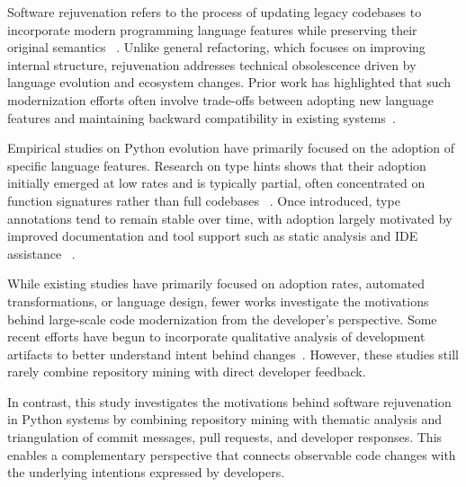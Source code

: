Software rejuvenation refers to the process of updating legacy codebases to incorporate modern programming language features while preserving their original semantics ~\cite{DBLP:conf/sofsem/PirkelbauerDS10}. Unlike general refactoring, which focuses on improving internal structure, rejuvenation addresses technical obsolescence driven by language evolution and ecosystem changes. Prior work has highlighted that such modernization efforts often involve trade-offs between adopting new language features and maintaining backward compatibility in existing systems~\cite{mendonca2026}.

Empirical studies on Python evolution have primarily focused on the adoption of specific language features. Research on type hints shows that their adoption initially emerged at low rates and is typically partial, often concentrated on function signatures rather than full codebases ~\cite{10.1145/3426422.3426981, 10.1145/3540250.3549114}. Once introduced, type annotations tend to remain stable over time, with adoption largely motivated by improved documentation and tool support such as static analysis and IDE assistance ~\cite{asarethird2026}.


While existing studies have primarily focused on adoption rates, automated transformations, or language design, fewer works investigate the motivations behind large-scale code modernization from the developer’s perspective. Some recent efforts have begun to incorporate qualitative analysis of development artifacts to better understand intent behind changes~\cite{DBLP:conf/sbqs/CarvalhoB0M24}. However, these studies still rarely combine repository mining with direct developer feedback.

In contrast, this study investigates the motivations behind software rejuvenation in Python systems by combining repository mining with thematic analysis and triangulation of commit messages, pull requests, and developer responses. This enables a complementary perspective that connects observable code changes with the underlying intentions expressed by developers.
